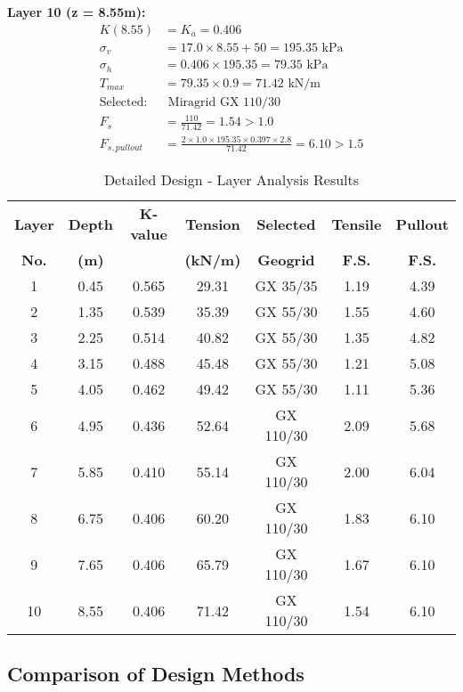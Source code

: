 \documentclass[10pt,a4paper,twocolumn]{article}
\begin{document}
\textbf{Layer 10 (z = 8.55m):}
\begin{align}
K(8.55) &= K_a = 0.406 \\
\sigma_v &= 17.0 \times 8.55 + 50 = 195.35 \text{ kPa} \\
\sigma_h &= 0.406 \times 195.35 = 79.35 \text{ kPa} \\
T_{max} &= 79.35 \times 0.9 = 71.42 \text{ kN/m} \\
\text{Selected:} &\text{ Miragrid GX 110/30} \\
F_s &= \frac{110}{71.42} = 1.54 > 1.0 \\
F_{s,pullout} &= \frac{2 \times 1.0 \times 195.35 \times 0.397 \times 2.8}{71.42} = 6.10 > 1.5
\end{align}
\begin{table*}[htbp]
\centering
\small
\caption{Detailed Design - Layer Analysis Results}
\label{tab:detailed_design}
\begin{tabular}{|c|c|c|c|c|c|c|}
\hline
\textbf{Layer} & \textbf{Depth} & \textbf{K-value} & \textbf{Tension} & \textbf{Selected} & \textbf{Tensile} & \textbf{Pullout} \\
\textbf{No.} & \textbf{(m)} & & \textbf{(kN/m)} & \textbf{Geogrid} & \textbf{F.S.} & \textbf{F.S.} \\
\hline
1 & 0.45 & 0.565 & 29.31 & GX 35/35 & 1.19 & 4.39 \\
\hline
2 & 1.35 & 0.539 & 35.39 & GX 55/30 & 1.55 & 4.60 \\
\hline
3 & 2.25 & 0.514 & 40.82 & GX 55/30 & 1.35 & 4.82 \\
\hline
4 & 3.15 & 0.488 & 45.48 & GX 55/30 & 1.21 & 5.08 \\
\hline
5 & 4.05 & 0.462 & 49.42 & GX 55/30 & 1.11 & 5.36 \\
\hline
6 & 4.95 & 0.436 & 52.64 & GX 110/30 & 2.09 & 5.68 \\
\hline
7 & 5.85 & 0.410 & 55.14 & GX 110/30 & 2.00 & 6.04 \\
\hline
8 & 6.75 & 0.406 & 60.20 & GX 110/30 & 1.83 & 6.10 \\
\hline
9 & 7.65 & 0.406 & 65.79 & GX 110/30 & 1.67 & 6.10 \\
\hline
10 & 8.55 & 0.406 & 71.42 & GX 110/30 & 1.54 & 6.10 \\
\hline
\end{tabular}
\end{table*}



\subsection{Comparison of Design Methods}
\end{document}
